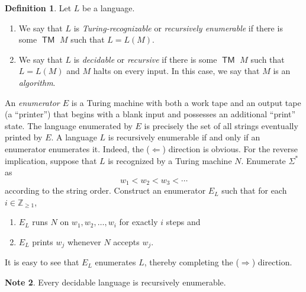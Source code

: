 \documentclass[10pt,letterpaper,cm]{nupset}
\theoremstyle{definition}
\newtheorem{definition}{Definition}[subsection]
\newtheorem{note}[definition]{Note}
\theoremstyle{theorem}
\theoremstyle{remark}
\newcommand{\Z}{\mathbb Z}
\newcommand{\1}{\mathbf{1}}
\newcommand{\0}{\vec 0}
\DeclareMathOperator{\TM}{\mathsf{TM}}
\begin{document}
\smallskip

\begin{definition} Let $L$ be a language.
\begin{enumerate}
\item We say that $L$ is \textit{Turing-recognizable} or \textit{recursively enumerable} if there is some $\TM$ $M$ such that $L = L(M)$.
\item We say that $L$ is \textit{decidable} or \textit{recursive} if there is some $\TM$ $M$ such that $L= L(M)$ and $M$ halts on every input. In this case, we say that $M$ is an \textit{algorithm}.
\end{enumerate}
\end{definition}

\smallskip

An \textit{enumerator $E$} is a Turing machine with both a work tape and an output tape (a ``printer'') that begins with a blank input and possesses an additional ``print'' state.  The language enumerated by $E$ is precisely the set of all strings eventually printed by $E$.  A language $L$ is recursively enumerable if and only if  an enumerator enumerates it.  Indeed, the ($\Longleftarrow$) direction is obvious. For the reverse implication, suppose that $L$ is recognized by a Turing machine $N$. Enumerate $\Sigma^{\ast}$ as $$w_1 < w_2 < w_3 < \cdots$$ according to the string order. Construct an enumerator $E_L$ such that for each $i\in \Z_{\geq 1}$,

\begin{enumerate}[label=(\arabic*)]
\item $E_L$ runs $N$ on $w_1, w_2, \ldots, w_i$ for exactly $i$ steps and
\item $E_L$ prints $w_j$ whenever $N$ accepts $w_j$.
\end{enumerate}

It is easy to see that $E_L$ enumerates $L$, thereby completing the ($\Longrightarrow$) direction.

\smallskip

\begin{note}
Every decidable language is recursively enumerable. 
\end{note}
\end{document}
